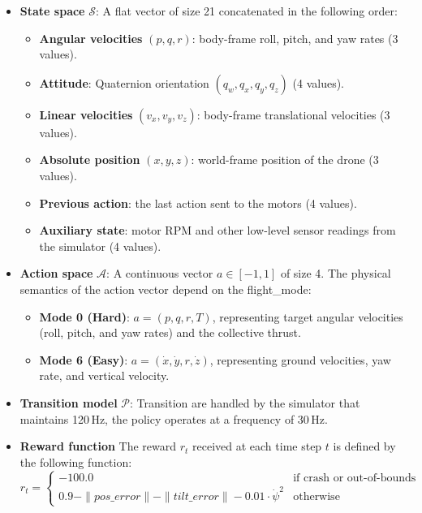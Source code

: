 \documentclass[11pt,a4paper]{article}
\begin{document}
\begin{itemize}
\item \textbf{State space} $\mathcal{S}$: A flat vector of size 21 concatenated in the following order:
\begin{itemize}
\item \textbf{Angular velocities} $(p, q, r)$: body-frame roll, pitch, and yaw rates (3 values).
\item \textbf{Attitude}: Quaternion orientation $(q_w, q_x, q_y, q_z)$ (4 values).
\item \textbf{Linear velocities} $(v_x, v_y, v_z)$: body-frame translational velocities (3 values).
\item \textbf{Absolute position} $(x, y, z)$: world-frame position of the drone (3 values).
\item \textbf{Previous action}: the last action sent to the motors (4 values).
\item \textbf{Auxiliary state}: motor RPM and other low-level sensor readings from the simulator (4 values).
\end{itemize}

\item \textbf{Action space} $\mathcal{A}$: A continuous vector $a \in [-1,1]$ of size 4. The physical semantics of the action vector depend on the flight\_mode:
\begin{itemize}
    \item \textbf{Mode 0 (Hard)}: $a = (p, q, r, T)$, representing target angular velocities (roll, pitch, and yaw rates) and the collective thrust.
    \item \textbf{Mode 6 (Easy)}: $a = (\dot{x}, \dot{y}, r, \dot{z})$, representing ground velocities, yaw rate, and vertical velocity.
\end{itemize}

\item \textbf{Transition model} $\mathcal{P}$: Transition are handled by the simulator that maintains 120\,Hz, the policy operates at a frequency of 30\,Hz.

\item \textbf{Reward function} The reward $r_t$ received at each time step $t$ is defined by the following function:
\begin{equation}
r_t = \begin{cases}
-100.0 & \text{if crash or out-of-bounds} \\
0.9 - \|pos\_error\| - \|tilt\_error\| - 0.01 \cdot \dot{\psi}^2 & \text{otherwise}
\end{cases}
\end{equation}


\end{itemize}
\end{document}
